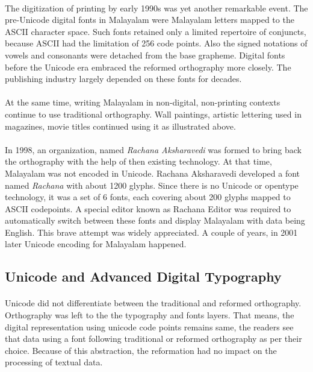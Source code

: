 \documentclass[10pt]{article}
\begin{document}
\paragraph{}
The digitization of printing by early 1990s was yet another remarkable event. The pre-Unicode digital fonts in Malayalam were Malayalam letters mapped to the ASCII character space. Such fonts retained only a limited repertoire of conjuncts, because ASCII had the limitation of 256 code points. Also the signed notations of vowels and consonants were detached from the base grapheme. Digital fonts before the Unicode era embraced the reformed orthography more closely. The publishing industry largely depended on these fonts for decades.

\paragraph{}
At the same time, writing Malayalam in non-digital, non-printing contexts continue to use traditional orthography. Wall paintings, artistic lettering used in magazines, movie titles continued using it as illustrated above.

\paragraph{}
In 1998, an organization, named \textit{Rachana Aksharavedi} was formed to bring back the orthography with the help of then existing technology. At that time, Malayalam was not encoded in Unicode. Rachana Aksharavedi developed a font named \textit{Rachana} with about 1200 glyphs. Since there is no Unicode or opentype technology, it was a set of 6 fonts, each covering about 200 glyphs mapped to ASCII codepoints. A special editor known as Rachana Editor was required to automatically switch between these fonts and display Malayalam with data being English. This brave attempt was widely appreciated. A couple of years, in 2001 later Unicode encoding for Malayalam happened.

\subsection{Unicode and Advanced Digital Typography}

\paragraph{}
Unicode did not differentiate between the traditional and reformed orthography. Orthography was left to the the typography and fonts layers. That means, the digital representation using unicode code points remains same, the readers see that data using a font following traditional or reformed orthography as per their choice. Because of this abstraction, the reformation had no impact on the processing of textual data.
\end{document}
